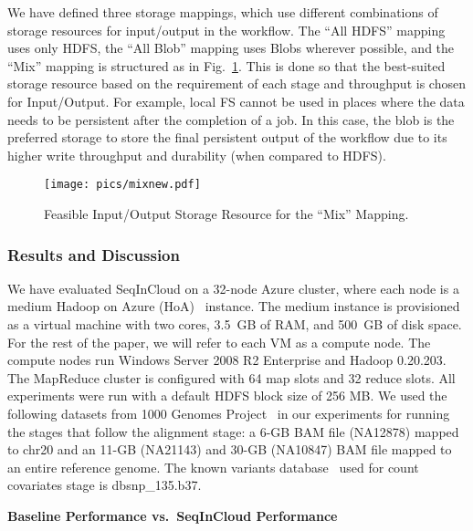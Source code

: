 We have defined three storage mappings, which use different combinations of storage resources for input/output in the workflow. The ``All HDFS'' mapping uses only HDFS, the ``All Blob'' mapping uses Blobs wherever possible, and the ``Mix'' mapping is structured as in Fig.~\ref{fig:mix}. This is done so that the best-suited storage resource based on the requirement of each stage and throughput is chosen for Input/Output. For example, local FS cannot be used in places where the data needs to be persistent after the completion of a job. In this case, the blob is the preferred storage to store the final persistent output of the workflow due to its higher write throughput and durability (when compared to HDFS).

\begin{figure}[htbp]
  \centering 
  \texttt{[image: pics/mixnew.pdf]}
  \caption{Feasible Input/Output Storage Resource for the ``Mix'' Mapping.}
  \label{fig:mix}
\end{figure}

\subsubsection{Results and Discussion}
\label{sec:results}

We have evaluated SeqInCloud on a 32-node Azure cluster, where each node is a medium Hadoop on Azure (HoA)~\cite{HOA} instance. The medium instance is provisioned as a virtual machine with two cores, 3.5~GB of RAM, and 500~GB of disk space. For the rest of the paper, we will refer to each VM as a compute node. The compute nodes run Windows Server 2008 R2 Enterprise and Hadoop 0.20.203. The MapReduce cluster is configured with 64 map slots and 32 reduce slots. All experiments were run with a default HDFS block size of 256 MB. We used the following datasets from 1000 Genomes Project~\cite{1000genome} in our experiments for running the stages that follow the alignment stage: a 6-GB BAM file (NA12878) mapped to chr20 and an 11-GB (NA21143) and 30-GB (NA10847) BAM file mapped to an entire reference genome. The known variants database~\cite{dbSNP} used for count covariates stage is dbsnp\_135.b37.

\noindent\textbf{Baseline Performance vs.\ SeqInCloud Performance}

